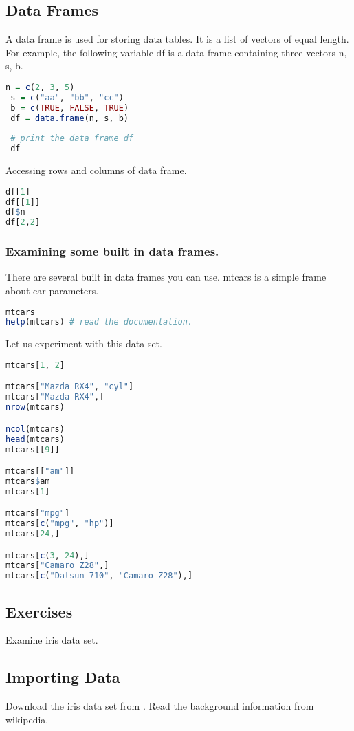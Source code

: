 \documentclass["../Applied_probabillity _and_statistics_lab_KTU.tex"]{subfiles}
\begin{document}
\subsection{Data Frames}

A data frame is used for storing data tables. It is a list of vectors of equal length. For example, the following variable df is a data frame containing three vectors n, s, b.
\begin{lstlisting}[language=R]
 n = c(2, 3, 5) 
 s = c("aa", "bb", "cc") 
 b = c(TRUE, FALSE, TRUE) 
 df = data.frame(n, s, b)  
 
 # print the data frame df
 df
\end{lstlisting}


Accessing rows and columns of data frame.
\begin{lstlisting}[language=R]
df[1]
df[[1]]
df$n
df[2,2]

\end{lstlisting}
\subsubsection{Examining some built in data frames.}
There are several built in data frames you can use. mtcars is a simple frame about car parameters.
\begin{lstlisting}[language=R]
 mtcars
help(mtcars) # read the documentation.
\end{lstlisting}
 Let us experiment with this data set.
 
 \begin{lstlisting}[language=R]
mtcars[1, 2]

mtcars["Mazda RX4", "cyl"] 
mtcars["Mazda RX4",]
nrow(mtcars) 

ncol(mtcars)  
head(mtcars)
mtcars[[9]] 

mtcars[["am"]] 
mtcars$am
mtcars[1] 

mtcars["mpg"]
mtcars[c("mpg", "hp")]
mtcars[24,] 

mtcars[c(3, 24),] 
mtcars["Camaro Z28",] 
mtcars[c("Datsun 710", "Camaro Z28"),]
\end{lstlisting}

\subsection{Exercises}
  Examine iris data set.
  
\subsection{Importing Data}  
Download the iris data set from . 
Read the background information from wikipedia.
\end{document}
